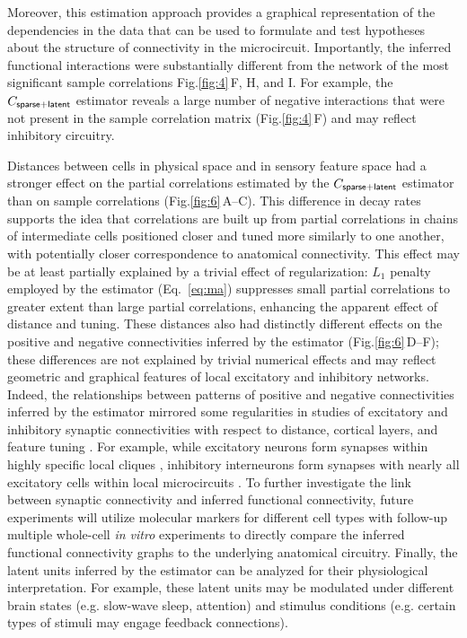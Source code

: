 \documentclass[10pt]{article}
\newcommand{\figref}[2]{Fig.\;\ref{fig:#1}\,#2}
\begin{document}
Moreover, this estimation approach provides a graphical representation of the dependencies in the data that can be used to formulate and test hypotheses about the structure of connectivity in the microcircuit. Importantly, the inferred functional interactions were substantially different from the network of the most significant sample correlations \figref{4}{F, H, and I}.  For example, the $C_{\sf sparse+latent}$ estimator reveals a large number of negative interactions that were not present in the sample correlation matrix (\figref{4}{F}) and may reflect inhibitory circuitry. 

Distances between cells in physical space and in sensory feature space had a stronger effect on the partial correlations estimated by the $C_{\sf sparse+latent}$ estimator than on sample correlations (\figref{6}{A--C}). This difference in decay rates supports the idea that correlations are built up from partial correlations in chains of intermediate cells positioned closer and tuned more similarly to one another, with potentially closer correspondence to anatomical connectivity.  This effect may be at least partially explained by a trivial effect of regularization: $L_1$ penalty employed by the estimator (Eq.~\ref{eq:ma}) suppresses small partial correlations to greater extent than large partial correlations, enhancing the apparent effect of distance and tuning.  These distances also had distinctly different effects on the positive and negative connectivities inferred by the estimator (\figref{6}{D--F}); these differences are not explained by trivial numerical effects and may reflect geometric and graphical features of local excitatory and inhibitory networks. Indeed, the relationships between patterns of positive and negative connectivities inferred by the estimator mirrored some regularities in studies of excitatory and inhibitory synaptic connectivities with respect to distance, cortical layers, and feature tuning \cite{Song:2005, Oswald:2008, Adesnik:2010, Perin:2011, Fino:2011, Hofer:2011, Isaacson:2011, Levy:2012}. For example, while excitatory neurons form synapses within highly specific local cliques \cite{Perin:2011}, inhibitory interneurons form synapses with nearly all excitatory cells within local microcircuits \cite{Fino:2011, Hofer:2011, Packer:2011}.  To further investigate the link between synaptic connectivity and inferred functional connectivity, future experiments will utilize molecular markers for different cell types with follow-up multiple whole-cell \emph{in vitro} experiments \cite{Hofer:2011, Ko:2013} to directly compare the inferred functional connectivity graphs to the underlying anatomical circuitry. Finally, the latent units inferred by the estimator can be analyzed for their physiological interpretation. For example, these latent units may be modulated under different brain states (e.g. slow-wave sleep, attention) and stimulus conditions (e.g. certain types of stimuli may engage feedback connections). 
\end{document}
